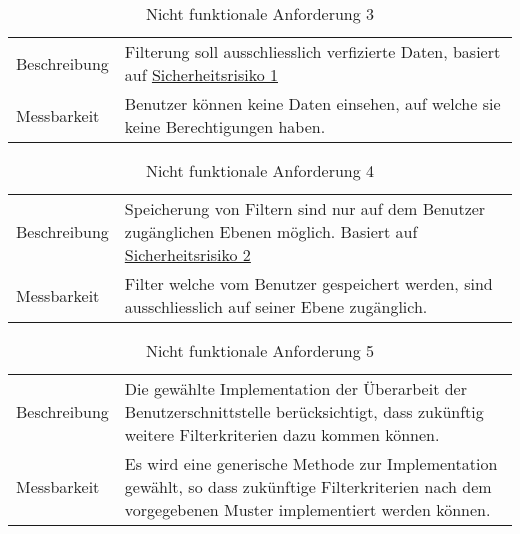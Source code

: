 \begin{table}[h!]
   \begin{tabular}{|L{0.3\textwidth}|L{0.6\textwidth}|}
       \hline
         \\[4pt]
       \hline
       Beschreibung & Filterung soll ausschliesslich verfizierte Daten, basiert auf \color{blue}\hyperref[sec1]{\color{blue} Sicherheitsrisiko 1}\color{black}  \\
       \hline
       Messbarkeit & Benutzer können keine Daten einsehen, auf welche sie keine Berechtigungen haben.  \\
       \hline
     \end{tabular}
     \caption{Nicht funktionale Anforderung 3}
\end{table}

\begin{table}[h!]
   \begin{tabular}{|L{0.3\textwidth}|L{0.6\textwidth}|}
       \hline
         \\[4pt]
       \hline
       Beschreibung & Speicherung von Filtern sind nur auf dem Benutzer zugänglichen Ebenen möglich. Basiert auf \color{blue}\hyperref[sec2]{\color{blue} Sicherheitsrisiko 2}\color{black}  \\
       \hline
       Messbarkeit & Filter welche vom Benutzer gespeichert werden, sind ausschliesslich auf seiner Ebene zugänglich.  \\
       \hline
     \end{tabular}
     \caption{Nicht funktionale Anforderung 4}
\end{table}

\begin{table}[h!]
   \begin{tabular}{|L{0.3\textwidth}|L{0.6\textwidth}|}
       \hline
         \\[4pt]
       \hline
       Beschreibung & Die gewählte Implementation der Überarbeit der Benutzerschnittstelle berücksichtigt, dass zukünftig
       weitere Filterkriterien dazu kommen können. \\
       \hline
       Messbarkeit & Es wird eine generische Methode zur Implementation gewählt, so dass zukünftige Filterkriterien nach dem 
       vorgegebenen Muster implementiert werden können.  \\
       \hline
     \end{tabular}
     \caption{Nicht funktionale Anforderung 5}
\end{table}

